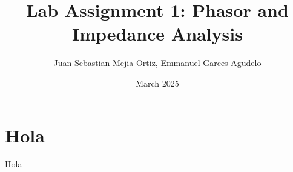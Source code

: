 \documentclass{article}
\title{Lab Assignment 1: Phasor and Impedance Analysis}
\author{Juan Sebastian Mejia Ortiz, Emmanuel Garces Agudelo}
\date{March 2025}
\begin{document}
\maketitle

\section{Hola}
Hola
\end{document}
